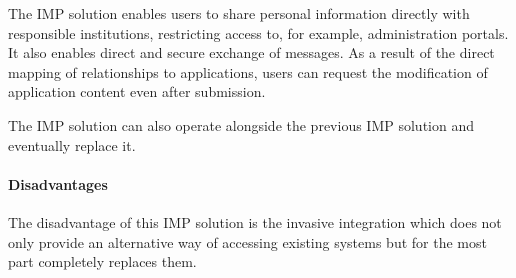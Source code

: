 The IMP solution enables users to share personal information directly with responsible institutions, restricting access to, for example, administration portals. It also enables direct and secure exchange of messages.
As a result of the direct mapping of relationships to applications, users can request the modification of application content even after submission.

The IMP solution can also operate alongside the previous IMP solution and eventually replace it.

\paragraph{Disadvantages}

The disadvantage of this IMP solution is the invasive integration which does not only provide an alternative way of accessing existing systems but for the most part completely replaces them.